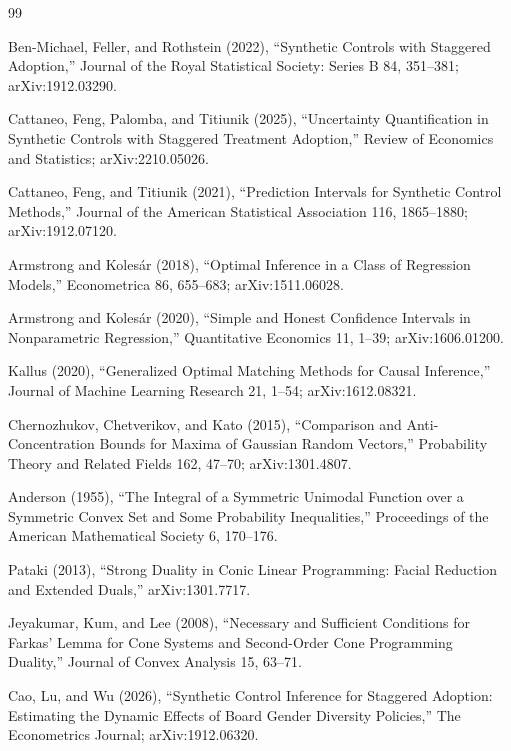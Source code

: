 \documentclass{article}
\begin{document}
\begin{thebibliography}{99}

   Ben-Michael, Feller, and Rothstein (2022), ``Synthetic Controls with Staggered Adoption,'' Journal of the Royal Statistical Society: Series B 84, 351--381; arXiv:1912.03290.

   Cattaneo, Feng, Palomba, and Titiunik (2025), ``Uncertainty Quantification in Synthetic Controls with Staggered Treatment Adoption,'' Review of Economics and Statistics; arXiv:2210.05026.

   Cattaneo, Feng, and Titiunik (2021), ``Prediction Intervals for Synthetic Control Methods,'' Journal of the American Statistical Association 116, 1865--1880; arXiv:1912.07120.

   Armstrong and Kolesár (2018), ``Optimal Inference in a Class of Regression Models,'' Econometrica 86, 655--683; arXiv:1511.06028.

   Armstrong and Kolesár (2020), ``Simple and Honest Confidence Intervals in Nonparametric Regression,'' Quantitative Economics 11, 1--39; arXiv:1606.01200.

   Kallus (2020), ``Generalized Optimal Matching Methods for Causal Inference,'' Journal of Machine Learning Research 21, 1--54; arXiv:1612.08321.

   Chernozhukov, Chetverikov, and Kato (2015), ``Comparison and Anti-Concentration Bounds for Maxima of Gaussian Random Vectors,'' Probability Theory and Related Fields 162, 47--70; arXiv:1301.4807.

   Anderson (1955), ``The Integral of a Symmetric Unimodal Function over a Symmetric Convex Set and Some Probability Inequalities,'' Proceedings of the American Mathematical Society 6, 170--176.

   Pataki (2013), ``Strong Duality in Conic Linear Programming: Facial Reduction and Extended Duals,'' arXiv:1301.7717.

   Jeyakumar, Kum, and Lee (2008), ``Necessary and Sufficient Conditions for Farkas' Lemma for Cone Systems and Second-Order Cone Programming Duality,'' Journal of Convex Analysis 15, 63--71.

   Cao, Lu, and Wu (2026), ``Synthetic Control Inference for Staggered Adoption: Estimating the Dynamic Effects of Board Gender Diversity Policies,'' The Econometrics Journal; arXiv:1912.06320.


\end{thebibliography}
\end{document}
